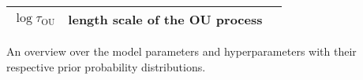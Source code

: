 \documentclass[12pt]{emulateapj}
\begin{document}
\begin{table*}[hbtp]
\begin{threeparttable}
\begin{tabularx}{\textwidth}{p{4.0cm}p{7.0cm}X}
$\log{\tau_{\mathrm{OU}}}$ & length scale of the OU process & \\
\bottomrule
\end{tabularx}
   \begin{tablenotes}
      \item{An overview over the model parameters and hyperparameters with their respective prior probability distributions.}
\end{tablenotes}
\end{threeparttable}
\label{tab:priortable}
\end{table*}
\end{document}
